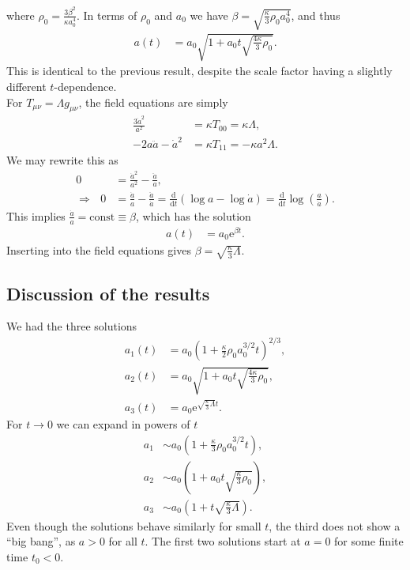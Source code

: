 \documentclass[english, parskip=full]{scrartcl}
\newcommand{\kla}{}
\newcommand{\tecxt}{}
\newcommand{\e}{\text{e}}
\begin{document}
where $\rho_0 = \frac{3\beta^2}{\kappa a_0^4}$.
In terms of $\rho_0$ and $a_0$ we have $\beta=\sqrt{\frac{\kappa}{3} \rho_0a_0^4}$, and thus
\begin{align}
a(t) &= a_0 \sqrt{1 + a_0t \sqrt{\frac{4\kappa}{3}\rho_0}}.
\end{align}
This is identical to the previous result, despite the scale factor having a slightly different $t$-dependence.
\\
For $T_{\mu\nu} = \Lambda g_{\mu\nu}$, the field equations are simply
\begin{align}
\frac{3\dot{a}^2}{a^2} &= \kappa T_{00} = \kappa \Lambda,\\
-2a\ddot{a} - \dot{a}^2 &= \kappa T_{11} = -\kappa a^2 \Lambda.
\end{align}
We may rewrite this as 
\begin{align}
0 &= \frac{\dot{a}^2}{a^2} - \frac{\ddot{a}}{a},\\
\Rightarrow\ \ \ 0 &= \frac{\dot{a}}{a} - \frac{\ddot{a}}{\dot{a}} = \frac{\tecxt\text{d}}{\tecxt\text{d}t} \kla\left( \log a - \log \dot{a} \right) = \frac{\tecxt\text{d}}{\tecxt\text{d}t} \log\kla\left( \frac{a}{\dot{a}} \right).
\end{align}
This implies $\frac{\dot{a}}{a} = \tecxt\text{const} \equiv \beta$, which has the solution
\begin{align}
a(t) &= a_0 \e^{\beta t}.
\end{align}
Inserting into the field equations gives $\beta = \sqrt{\frac{\kappa}{3} \Lambda}$.
\subsection*{Discussion of the results}
We had the three solutions
\begin{align}
a_1(t) &= a_0 \kla\left( 1 + \frac{\kappa}{2} \rho_0a_0^{3/2}t \right)^{2/3},\\
a_2(t) &= a_0 \sqrt{1 + a_0t \sqrt{\frac{4\kappa}{3}\rho_0}},\\
a_3(t) &= a_0\e^{\sqrt{\frac{\kappa}{3}\Lambda} t}.
\end{align}
For $t\rightarrow 0$ we can expand in powers of $t$
\begin{align}
a_1 &\sim a_0\kla\left( 1 + \frac{\kappa}{3} \rho_0a_0^{3/2} t \right),\\
a_2 &\sim a_0 \kla\left( 1 + a_0t\sqrt{\frac{\kappa}{3}\rho_0} \right),\\
a_3 &\sim a_0 \kla\left( 1 + t\sqrt{\frac{\kappa}{3}\Lambda} \right).
\end{align}
Even though the solutions behave similarly for small $t$, the third does not show a ``big bang'', as $a>0$ for all $t$.
The first two solutions start at $a=0$ for some finite time $t_0<0$.


\end{document}
